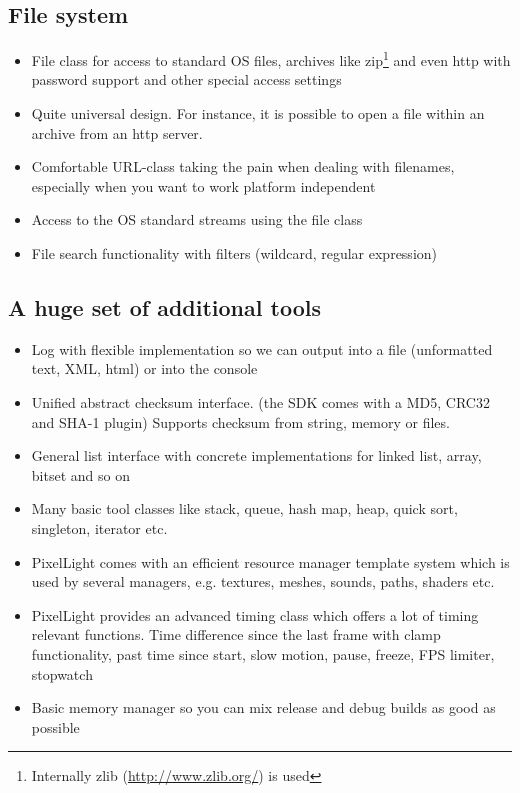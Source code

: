 \subsection{File system}
\begin{itemize}
\item{File class for access to standard OS files, archives like zip\footnote{Internally zlib (\url{http://www.zlib.org/}) is used} and even http with password support and other special access settings}
\item{Quite universal design. For instance, it is possible to open a file within an archive from an http server.}
\item{Comfortable URL-class taking the pain when dealing with filenames, especially when you want to work platform independent}
\item{Access to the OS standard streams using the file class}
\item{File search functionality with filters (wildcard, regular expression)}
\end{itemize}


\subsection{A huge set of additional tools}
\begin{itemize}
\item{Log with flexible implementation so we can output into a file (unformatted text, XML, html) or into the console}
\item{Unified abstract checksum interface. (the SDK comes with a MD5, CRC32 and SHA-1 plugin) Supports checksum from string, memory or files.}
\item{General list interface with concrete implementations for linked list, array, bitset and so on}
\item{Many basic tool classes like stack, queue, hash map, heap, quick sort, singleton, iterator etc.}
\item{PixelLight comes with an efficient resource manager template system which is used by several managers, e.g. textures, meshes, sounds, paths, shaders etc. }
\item{PixelLight provides an advanced timing class which offers a lot of timing relevant functions. Time difference since the last frame with clamp functionality, past time since start, slow motion, pause, freeze, FPS limiter, stopwatch}
\item{Basic memory manager so you can mix release and debug builds as good as possible}
\end{itemize}




